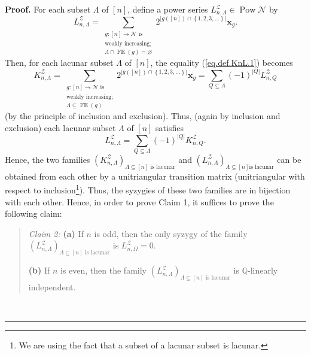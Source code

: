 \documentclass[numbers=enddot,12pt,final,onecolumn,notitlepage]{scrartcl}%
\theoremstyle{definition}
\newenvironment{statement}{\begin{quote}}{\end{quote}}
\newenvironment{proof}[1][Proof]{\noindent\textbf{#1.} }{\ \rule{0.5em}{0.5em}}
\let\sumnonlimits\sum
\renewcommand{\sum}{\sumnonlimits\limits}
\begin{document}
\begin{proof}
For each subset $\Lambda$ of $\left[  n\right]  $, define a power series
$L_{n,\Lambda}^{\mathcal{Z}}\in\operatorname*{Pow}\mathcal{N}$ by%
\[
L_{n,\Lambda}^{\mathcal{Z}}=\sum_{\substack{g:\left[  n\right]  \rightarrow
\mathcal{N}\text{ is}\\\text{weakly increasing;}\\\Lambda\cap
\operatorname*{FE}\left(  g\right)  =\varnothing}}2^{\left\vert g\left(
\left[  n\right]  \right)  \cap\left\{  1,2,3,\ldots\right\}  \right\vert
}\mathbf{x}_{g}.
\]
Then, for each lacunar subset $\Lambda$ of $\left[  n\right]  $, the equality
(\ref{eq.def.KnL.1}) becomes%
\[
K_{n,\Lambda}^{\mathcal{Z}}=\sum_{\substack{g:\left[  n\right]  \rightarrow
\mathcal{N}\text{ is}\\\text{weakly increasing;}\\\Lambda\subseteq
\operatorname*{FE}\left(  g\right)  }}2^{\left\vert g\left(  \left[  n\right]
\right)  \cap\left\{  1,2,3,\ldots\right\}  \right\vert }\mathbf{x}_{g}%
=\sum_{Q\subseteq\Lambda}\left(  -1\right)  ^{\left\vert Q\right\vert }%
L_{n,Q}^{\mathcal{Z}}%
\]
(by the principle of inclusion and exclusion). Thus, (again by inclusion and
exclusion) each lacunar subset $\Lambda$ of $\left[  n\right]  $ satisfies%
\[
L_{n,\Lambda}^{\mathcal{Z}}=\sum_{Q\subseteq\Lambda}\left(  -1\right)
^{\left\vert Q\right\vert }K_{n,Q}^{\mathcal{Z}}.
\]
Hence, the two families $\left(  K_{n,\Lambda}^{\mathcal{Z}}\right)
_{\Lambda\subseteq\left[  n\right]  \text{ is lacunar}}$ and $\left(
L_{n,\Lambda}^{\mathcal{Z}}\right)  _{\Lambda\subseteq\left[  n\right]  \text{
is lacunar}}$ can be obtained from each other by a unitriangular transition
matrix (unitriangular with respect to inclusion\footnote{We are using the fact
that a subset of a lacunar subset is lacunar.}). Thus, the syzygies of these
two families are in bijection with each other. Hence, in order to prove Claim
1, it suffices to prove the following claim:

\begin{statement}
\textit{Claim 2:} \textbf{(a)} If $n$ is odd, then the only syzygy of the
family $\left(  L_{n,\Lambda}^{\mathcal{Z}}\right)  _{\Lambda\subseteq\left[
n\right]  \text{ is lacunar}}$ is $L_{n,\Omega}^{\mathcal{Z}}=0$.

\textbf{(b)} If $n$ is even, then the family $\left(  L_{n,\Lambda
}^{\mathcal{Z}}\right)  _{\Lambda\subseteq\left[  n\right]  \text{ is
lacunar}}$ is $\mathbb{Q}$-linearly independent.
\end{statement}


\end{proof}
\end{document}
